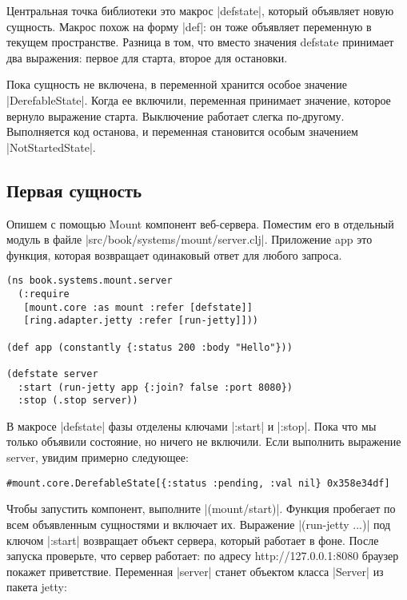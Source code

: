 Центральная точка библиотеки это макрос \spverb|defstate|, который объявляет новую
сущность. Макрос похож на форму \spverb|def|: он тоже объявляет переменную в текущем
пространстве. Разница в том, что вместо значения defstate принимает два
выражения: первое для старта, второе для остановки.

Пока сущность не включена, в переменной хранится особое значение
\spverb|DerefableState|. Когда ее включили, переменная принимает значение, которое
вернуло выражение старта. Выключение работает слегка по-другому. Выполняется код
останова, и переменная становится особым значением \spverb|NotStartedState|.

\subsection{Первая сущность}

Опишем с помощью Mount компонент веб-сервера. Поместим его в отдельный модуль в
файле \spverb|src/book/systems/mount/server.clj|. Приложение app это функция, которая
возвращает одинаковый ответ для любого запроса.

\begin{verbatim}
(ns book.systems.mount.server
  (:require
   [mount.core :as mount :refer [defstate]]
   [ring.adapter.jetty :refer [run-jetty]]))

(def app (constantly {:status 200 :body "Hello"}))

(defstate server
  :start (run-jetty app {:join? false :port 8080})
  :stop (.stop server))
\end{verbatim}

В макросе \spverb|defstate| фазы отделены ключами \spverb|:start| и \spverb|:stop|. Пока что мы
только объявили состояние, но ничего не включили. Если выполнить выражение
server, увидим примерно следующее:

\begin{verbatim}
#mount.core.DerefableState[{:status :pending, :val nil} 0x358e34df]
\end{verbatim}

Чтобы запустить компонент, выполните \spverb|(mount/start)|. Функция пробегает по всем
объявленным сущностями и включает их. Выражение \spverb|(run-jetty ...)| под ключом
\spverb|:start| возвращает объект сервера, который работает в фоне. После запуска
проверьте, что сервер работает: по адресу http://127.0.0.1:8080 браузер покажет
приветствие. Переменная \spverb|server| станет объектом класса \spverb|Server| из пакета
jetty:

